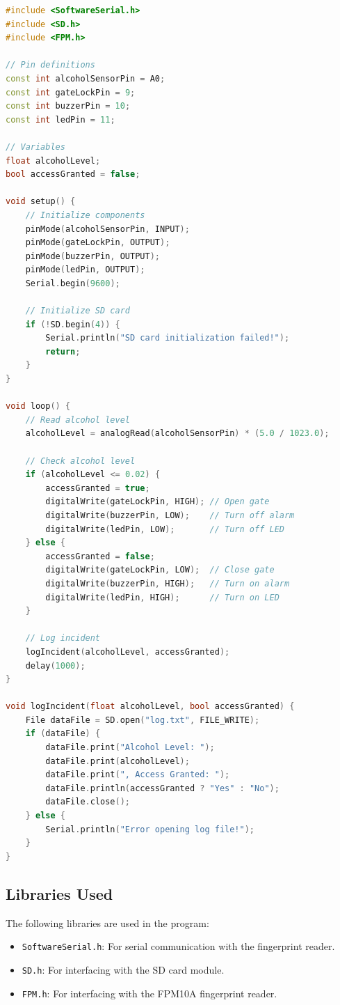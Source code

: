\begin{lstlisting}[language=C++, caption={Main Program for Alcohol Detection System}]
#include <SoftwareSerial.h>
#include <SD.h>
#include <FPM.h>

// Pin definitions
const int alcoholSensorPin = A0;
const int gateLockPin = 9;
const int buzzerPin = 10;
const int ledPin = 11;

// Variables
float alcoholLevel;
bool accessGranted = false;

void setup() {
    // Initialize components
    pinMode(alcoholSensorPin, INPUT);
    pinMode(gateLockPin, OUTPUT);
    pinMode(buzzerPin, OUTPUT);
    pinMode(ledPin, OUTPUT);
    Serial.begin(9600);

    // Initialize SD card
    if (!SD.begin(4)) {
        Serial.println("SD card initialization failed!");
        return;
    }
}

void loop() {
    // Read alcohol level
    alcoholLevel = analogRead(alcoholSensorPin) * (5.0 / 1023.0);

    // Check alcohol level
    if (alcoholLevel <= 0.02) {
        accessGranted = true;
        digitalWrite(gateLockPin, HIGH); // Open gate
        digitalWrite(buzzerPin, LOW);    // Turn off alarm
        digitalWrite(ledPin, LOW);       // Turn off LED
    } else {
        accessGranted = false;
        digitalWrite(gateLockPin, LOW);  // Close gate
        digitalWrite(buzzerPin, HIGH);   // Turn on alarm
        digitalWrite(ledPin, HIGH);      // Turn on LED
    }

    // Log incident
    logIncident(alcoholLevel, accessGranted);
    delay(1000);
}

void logIncident(float alcoholLevel, bool accessGranted) {
    File dataFile = SD.open("log.txt", FILE_WRITE);
    if (dataFile) {
        dataFile.print("Alcohol Level: ");
        dataFile.print(alcoholLevel);
        dataFile.print(", Access Granted: ");
        dataFile.println(accessGranted ? "Yes" : "No");
        dataFile.close();
    } else {
        Serial.println("Error opening log file!");
    }
}
\end{lstlisting}

\subsection{Libraries Used}
The following libraries are used in the program:
\begin{itemize}
    \item \texttt{SoftwareSerial.h}: For serial communication with the fingerprint reader.
    \item \texttt{SD.h}: For interfacing with the SD card module.
    \item \texttt{FPM.h}: For interfacing with the FPM10A fingerprint reader.
\end{itemize}